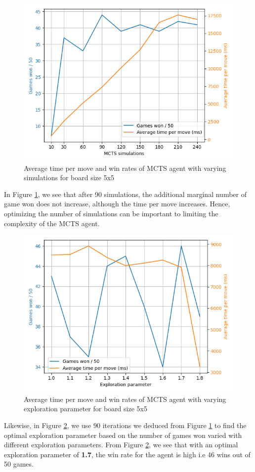 \begin{figure}[!ht]
    \centering
    \includegraphics[width=0.7\linewidth]{../img/mcts_simulation_grid_search.png}
    \caption{Average time per move and win rates of MCTS agent with varying simulations for board size 5x5}
    \label{fig:mcts_simulations}
\end{figure}

In Figure \ref{fig:mcts_simulations}, we see that after 90 simulations, the additional marginal number of game won does not increase, although the time per move increases. Hence, optimizing the number of simulations can be important to limiting the complexity of the \gls{MCTS} agent.

\begin{figure}[!ht]
    \centering
    \includegraphics[width=0.7\linewidth]{../img/mcts_exploration_param_grid_search.png}
    \caption{Average time per move and win rates of MCTS agent with varying exploration parameter for board size 5x5}
    \label{fig:mcts_exp_simulations}
\end{figure}

Likewise, in Figure \ref{fig:mcts_exp_simulations}, we use 90 iterations we deduced from Figure \ref{fig:mcts_simulations} to find the optimal exploration parameter based on the number of games won varied with different exploration parameters. From Figure \ref{fig:mcts_exp_simulations}, we see that with an optimal exploration parameter of \textbf{1.7}, the win rate for the agent is high i.e 46 wins out of 50 games.

